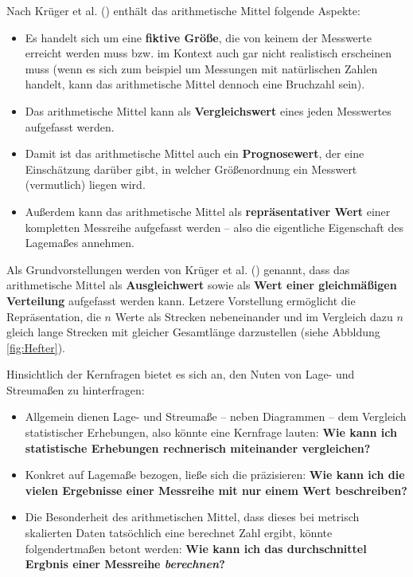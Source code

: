 \documentclass[
]{scrbook}
\providecommand{\tightlist}{%
  \setlength{\itemsep}{0pt}\setlength{\parskip}{0pt}}
\theoremstyle{definition}
\theoremstyle{definition}
\theoremstyle{definition}
\theoremstyle{definition}
\theoremstyle{remark}
\begin{document}
Nach Krüger et al. () enthält das arithmetische Mittel folgende Aspekte:

\begin{itemize}
\tightlist
\item
  Es handelt sich um eine \textbf{fiktive Größe}, die von keinem der Messwerte erreicht werden muss bzw. im Kontext auch gar nicht realistisch erscheinen muss (wenn es sich zum beispiel um Messungen mit natürlischen Zahlen handelt, kann das arithmetische Mittel dennoch eine Bruchzahl sein).
\item
  Das arithmetische Mittel kann als \textbf{Vergleichswert} eines jeden Messwertes aufgefasst werden.
\item
  Damit ist das arithmetische Mittel auch ein \textbf{Prognosewert}, der eine Einschätzung darüber gibt, in welcher Größenordnung ein Messwert (vermutlich) liegen wird.
\item
  Außerdem kann das arithmetische Mittel als \textbf{repräsentativer Wert} einer kompletten Messreihe aufgefasst werden -- also die eigentliche Eigenschaft des Lagemaßes annehmen.
\end{itemize}

Als \textcolor{semanticColor}{Grundvorstellungen} werden von Krüger et al. () genannt, dass das arithmetische Mittel als \textbf{Ausgleichwert} sowie als \textbf{Wert einer gleichmäßigen Verteilung} aufgefasst werden kann. Letzere Vorstellung ermöglicht die Repräsentation, die \(n\) Werte als Strecken nebeneinander und im Vergleich dazu \(n\) gleich lange Strecken mit gleicher Gesamtlänge darzustellen (siehe Abbldung \ref{fig:Hefter}).

Hinsichtlich der \textcolor{concreteColor}{Kernfragen} bietet es sich an, den Nuten von Lage- und Streumaßen zu hinterfragen:

\begin{itemize}
\tightlist
\item
  Allgemein dienen Lage- und Streumaße -- neben Diagrammen -- dem Vergleich statistischer Erhebungen, also könnte eine Kernfrage lauten: \textbf{Wie kann ich statistische Erhebungen rechnerisch miteinander vergleichen?}
\item
  Konkret auf Lagemaße bezogen, ließe sich die präzisieren: \textbf{Wie kann ich die vielen Ergebnisse einer Messreihe mit nur einem Wert beschreiben?}
\item
  Die Besonderheit des arithmetischen Mittel, dass dieses bei metrisch skalierten Daten tatsöchlich eine berechnet Zahl ergibt, könnte folgendertmaßen betont werden: \textbf{Wie kann ich das durchschnittel Ergbnis einer Messreihe \emph{berechnen}?}
\end{itemize}
\end{document}
